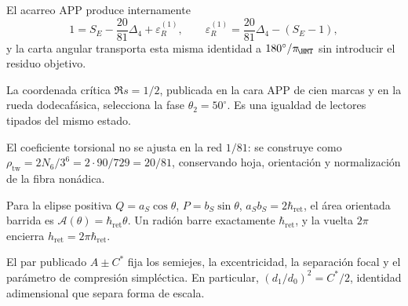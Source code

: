 \begin{exactbox}[title={Cierre exacto e independencia prospectiva}]
El acarreo APP produce internamente
\[
1=S_E-\frac{20}{81}\Delta_4+\varepsilon_R^{(1)},
\qquad
\varepsilon_R^{(1)}=\frac{20}{81}\Delta_4-(S_E-1),
\]
y la carta angular transporta esta misma identidad a
\(180^\circ/\pi_{\!\HMT}\) sin introducir el residuo objetivo.
\end{exactbox}

\begin{exactbox}[title={Coordenada crítica de \(50^\circ\)}]
La coordenada crítica \(\Re s=1/2\), publicada en la cara APP de cien
marcas y en la rueda dodecafásica, selecciona la fase
\(\theta_2=50^\circ\). Es una igualdad de lectores tipados del mismo estado.
\end{exactbox}

\begin{exactbox}[title={Densidad bidireccional nonádica \(20/81\)}]
El coeficiente torsional no se ajusta en la red \(1/81\): se construye como
\(\rho_{\mathrm{tw}}=2N_6/3^6=2\cdot90/729=20/81\), conservando hoja,
orientación y normalización de la fibra nonádica.
\end{exactbox}

\begin{exactbox}[title={Ley areal del radión}]
Para la elipse positiva
\(Q=a_S\cos\theta\), \(P=b_S\sin\theta\),
\(a_Sb_S=2\hbar_{\mathrm{ret}}\), el área orientada barrida es
\(\mathcal A(\theta)=\hbar_{\mathrm{ret}}\theta\). Un radión barre exactamente
\(\hbar_{\mathrm{ret}}\), y la vuelta \(2\pi\) encierra
\(h_{\mathrm{ret}}=2\pi\hbar_{\mathrm{ret}}\).
\end{exactbox}

\begin{exactbox}[title={Invariantes focales del operador positivo}]
El par publicado \(A\pm C^\ast\) fija los semiejes, la excentricidad, la
separación focal y el parámetro de compresión simpléctica. En particular,
\((d_1/d_0)^2=C^\ast/2\), identidad adimensional que separa forma de escala.
\end{exactbox}

